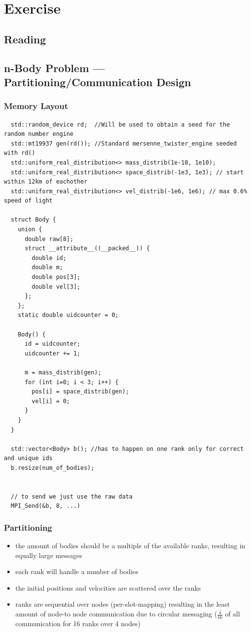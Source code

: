 \documentclass[]{scrartcl}
\newcommand{\exercise}{Exercise \thesection}
\begin{document}
\section*{\exercise}

\subsection{Reading}
\subsection{n-Body Problem --- Partitioning/Communication Design}
\subsubsection{Memory Layout}

\begin{verbatim}
  std::random_device rd;  //Will be used to obtain a seed for the random number engine
  std::mt19937 gen(rd()); //Standard mersenne_twister_engine seeded with rd()
  std::uniform_real_distribution<> mass_distrib(1e-10, 1e10);
  std::uniform_real_distribution<> space_distrib(-1e3, 1e3); // start within 12km of eachother
  std::uniform_real_distribution<> vel_distrib(-1e6, 1e6); // max 0.6% speed of light

  struct Body {
    union {
      double raw[8];
      struct __attribute__((__packed__)) {
        double id;
        double m;
        double pos[3];
        double vel[3];
      };
    };
    static double uidcounter = 0;

    Body() {
      id = uidcounter;
      uidcounter += 1;

      m = mass_distrib(gen);
      for (int i=0; i < 3; i++) {
        pos[i] = space_distrib(gen);
        vel[i] = 0;
      }
    }
  }

  std::vector<Body> b(); //has to happen on one rank only for correct and unique ids
  b.resize(num_of_bodies);


  // to send we just use the raw data
  MPI_Send(&b, 8, ...)
\end{verbatim}

\subsubsection{Partitioning}

\begin{itemize}
  \item the amount of bodies should be a multiple of the available ranks, resulting in equally large messages
  \item each rank will handle a number of bodies
  \item the initial positions and velocities are scattered over the ranks
  \item ranks are sequential over nodes (per-slot-mapping) resulting in the least amount of node-to node communication due to circular messaging ($\frac{4}{16}$ of all communication for 16 ranks over 4 nodes)
\end{itemize}
\end{document}
